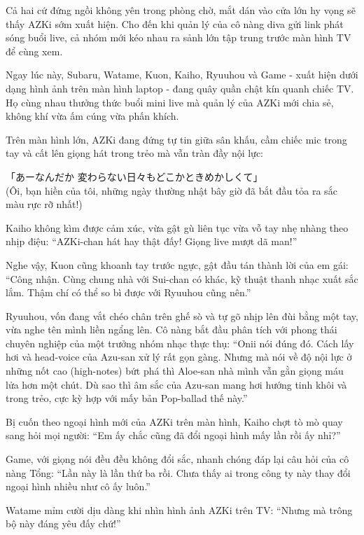 \documentclass[../main.tex]{subfiles}
\begin{document}

Cả hai cứ đứng ngồi không yên trong phòng chờ, mắt dán vào cửa lớn hy vọng sẽ thấy AZKi sớm xuất hiện. Cho đến khi quản lý của cô nàng diva gửi link phát sóng buổi live, cả nhóm mới kéo nhau ra sảnh lớn tập trung trước màn hình TV để cùng xem.

Ngay lúc này, Subaru, Watame, Kuon, Kaiho, Ryuuhou và Game - xuất hiện dưới dạng hình ảnh trên màn hình laptop - đang quây quần chật kín quanh chiếc TV. Họ cùng nhau thưởng thức buổi mini live mà quản lý của AZKi mới chia sẻ, không khí vừa ấm cúng vừa phấn khích.

Trên màn hình lớn, AZKi đang đứng tự tin giữa sân khấu, cầm chiếc mic trong tay và cất lên giọng hát trong trẻo mà vẫn tràn đầy nội lực:

\begin{center}
  「あーなんだか 変わらない日々もどこかときめかしくて」\\(Ôi, bạn hiền của tôi, những ngày thường nhật bây giờ đã bắt đầu tỏa ra sắc màu rực rỡ nhất!)
\end{center}

Kaiho không kìm được cảm xúc, vừa gật gù liên tục vừa vỗ tay nhẹ nhàng theo nhịp điệu: ``AZKi-chan hát hay thật đấy! Giọng live mượt dã man!''

Nghe vậy, Kuon cũng khoanh tay trước ngực, gật đầu tán thành lời của em gái: ``Công nhận. Cùng chung nhà với Sui-chan có khác, kỹ thuật thanh nhạc xuất sắc lắm. Thậm chí có thể so bì được với Ryuuhou cũng nên.''

Ryuuhou, vốn đang vắt chéo chân trên ghế sò và tự gõ nhịp lên đùi bằng một tay, vừa nghe tên mình liền ngẩng lên. Cô nàng bắt đầu phân tích với phong thái chuyên nghiệp của một trưởng nhóm nhạc thực thụ: ``Onii nói đúng đó. Cách lấy hơi và head-voice của Azu-san xử lý rất gọn gàng. Nhưng mà nói về độ nội lực ở những nốt cao (high-notes) bứt phá thì Aloe-san nhà mình vẫn gằn giọng máu lửa hơn một chút. Dù sao thì âm sắc của Azu-san mang hơi hướng tinh khôi và trong trẻo, cực kỳ hợp với mấy bản Pop-ballad thế này.''

Bị cuốn theo ngoại hình mới của AZKi trên màn hình, Kaiho chợt tò mò quay sang hỏi mọi người: ``Em ấy chắc cũng đã đổi ngoại hình mấy lần rồi ấy nhỉ?''

Game, với giọng nói đều đều không đổi sắc, nhanh chóng đáp lại câu hỏi của cô nàng Tổng: ``Lần này là lần thứ ba rồi. Chưa thấy ai trong công ty này thay đổi ngoại hình nhiều như cô ấy luôn.''

Watame mỉm cười dịu dàng khi nhìn hình ảnh AZKi trên TV: ``Nhưng mà trông bộ này đáng yêu đấy chứ!''
\end{document}
